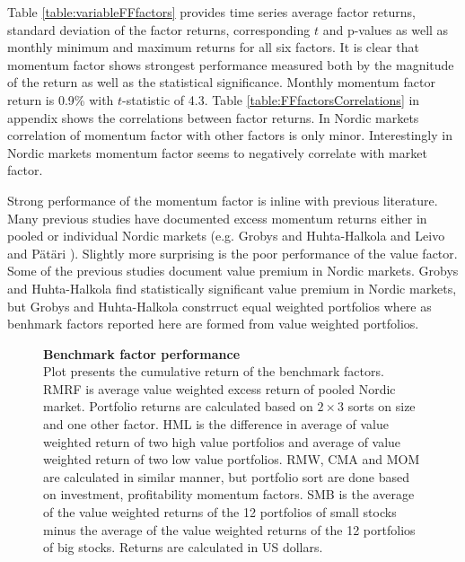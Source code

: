\documentclass{article}
\begin{document}
Table \ref{table:variableFFfactors} provides time series average factor returns, standard deviation of the factor returns, corresponding $t$ and p-values as well as monthly minimum and maximum returns for all six factors. It is clear that momentum factor shows strongest performance measured both by the magnitude of the return as well as the statistical significance. Monthly momentum factor return is 0.9\% with $t$-statistic of 4.3. Table \ref{table:FFfactorsCorrelations} in appendix shows the correlations between factor returns. In Nordic markets correlation of momentum factor with other factors is only minor. Interestingly in Nordic markets momentum factor seems to negatively correlate with market factor. 

Strong performance of the momentum factor is inline with previous literature. Many previous studies have documented excess momentum returns either in pooled or individual Nordic markets (e.g. Grobys and Huhta-Halkola \citeyear{grobys} and Leivo and Pätäri \citeyear{leivo2011}). Slightly more surprising is the poor performance of the value factor. Some of the previous studies document value premium in Nordic markets. Grobys and Huhta-Halkola \citeyear{grobys} find statistically significant value premium in Nordic markets, but Grobys and Huhta-Halkola constrruct equal weighted portfolios where as benhmark factors reported here are formed from value weighted portfolios.

\begin{figure}[h]
\centering
\caption[Benchmark factor performance]{\textbf{Benchmark factor performance}\\ Plot presents the cumulative return of the benchmark factors. RMRF is average value weighted excess return of pooled Nordic market. Portfolio returns are calculated based on $2 \times 3$ sorts on size and one other factor. HML is the difference in average of value weighted return of two high value portfolios and average of value weighted return of two low value portfolios. RMW, CMA and MOM are calculated in similar manner, but portfolio sort are done based on investment, profitability momentum factors. SMB is the average of the value weighted returns of the 12 portfolios of small stocks minus the average of the value weighted returns of the 12 portfolios of big stocks. Returns are calculated in US dollars.}

\label{plot:factor_performance}
\end{figure}
\end{document}

